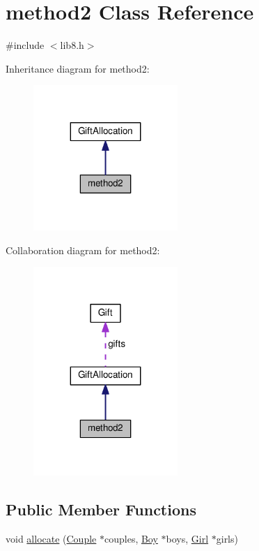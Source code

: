 \hypertarget{classmethod2}{}\section{method2 Class Reference}
\label{classmethod2}


{\ttfamily \#include $<$lib8.\+h$>$}



Inheritance diagram for method2\+:
\nopagebreak
\begin{figure}[H]
\begin{center}
\leavevmode
\includegraphics[width=155pt]{classmethod2__inherit__graph}
\end{center}
\end{figure}


Collaboration diagram for method2\+:
\nopagebreak
\begin{figure}[H]
\begin{center}
\leavevmode
\includegraphics[width=155pt]{classmethod2__coll__graph}
\end{center}
\end{figure}
\subsection*{Public Member Functions}
\begin{DoxyCompactItemize}
\item 
void \hyperlink{classmethod2_af5e7e4483c463a9e13a731d7d56a99f1}{allocate} (\hyperlink{classCouple}{Couple} $\ast$couples, \hyperlink{classBoy}{Boy} $\ast$boys, \hyperlink{classGirl}{Girl} $\ast$girls)
\end{DoxyCompactItemize}
